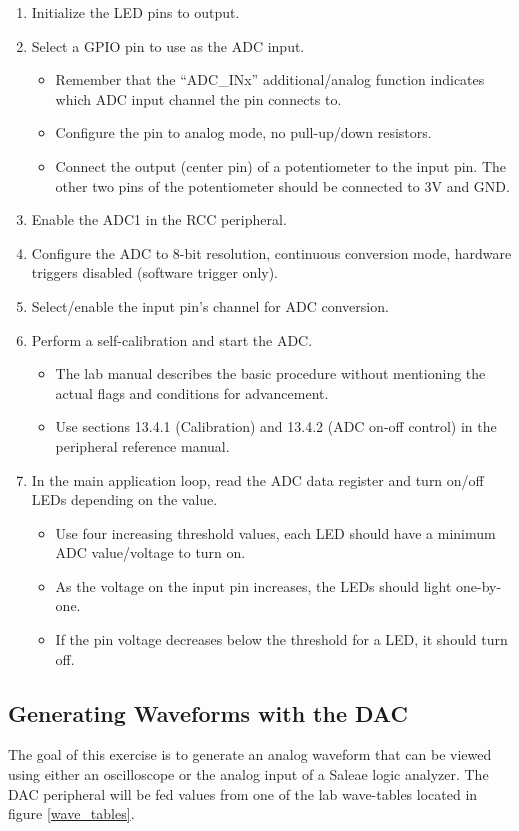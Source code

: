 \documentclass[11pt,fleqn]{book} %
\begin{document}
\begin{enumerate} 
    \item Initialize the LED pins to output.
    \item Select a GPIO pin to use as the ADC input.
    \begin{itemize}
        \item Remember that the ``ADC\_INx'' additional/analog function indicates which ADC input channel the pin connects to. 
        \item Configure the pin to analog mode, no pull-up/down resistors.
        \item Connect the output (center pin) of a potentiometer to the input pin. The other two pins of the potentiometer should be connected to 3V and GND.
    \end{itemize} 
    \item Enable the ADC1 in the RCC peripheral. 
    \item Configure the ADC to 8-bit resolution, continuous conversion mode, hardware triggers disabled (software trigger only).
    \item Select/enable the input pin's channel for ADC conversion.
    \item Perform a self-calibration and start the ADC.
    \begin{itemize}
        \item The lab manual describes the basic procedure without mentioning the actual flags and conditions for advancement. 
        \item Use sections 13.4.1 (Calibration) and 13.4.2 (ADC on-off control) in the peripheral reference manual. 
    \end{itemize}
    \item In the main application loop, read the ADC data register and turn on/off LEDs depending on the value.
    \begin{itemize}
        \item Use four increasing threshold values, each LED should have a minimum ADC value/voltage to turn on.
        \item As the voltage on the input pin increases, the LEDs should light one-by-one.
        \item If the pin voltage decreases below the threshold for a LED, it should turn off. 
    \end{itemize}
\end{enumerate}



\subsection{Generating Waveforms with the DAC}
The goal of this exercise is to generate an analog waveform that can be viewed using either an oscilloscope or the analog input of a Saleae logic analyzer. The DAC peripheral will be fed values from one of the lab wave-tables located in figure \ref{wave_tables}.
\end{document}
